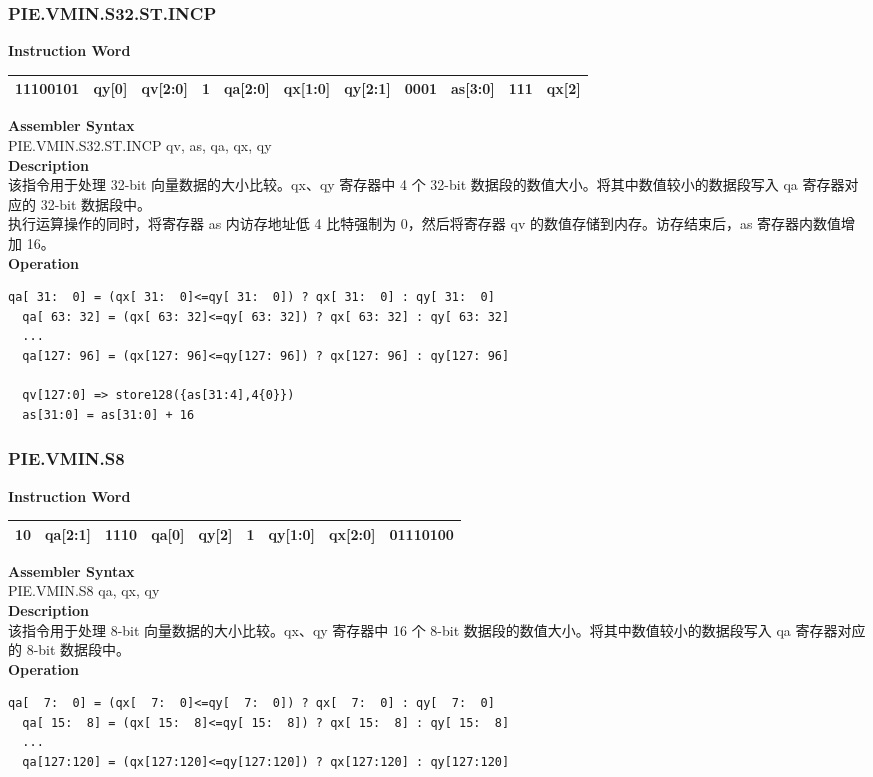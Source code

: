 \newpage
\subsubsection{PIE.VMIN.S32.ST.INCP}\label{instruction:PIEVMINS32STINCP}
\setlength\tabcolsep{6pt}
\textbf{Instruction Word} \\
\begin{tabular}{|c|c|c|c|c|c|c|c|c|c|c|}
	\hline
	11100101 & qy[0] & qv[2:0] & 1 & qa[2:0] & qx[1:0] & qy[2:1] & 0001 & as[3:0] & 111 & qx[2] \\
	\hline
\end{tabular}

\textbf{Assembler Syntax} \\
PIE.VMIN.S32.ST.INCP qv, as, qa, qx, qy \\
\textbf{Description} \\
该指令用于处理 32-bit 向量数据的大小比较。qx、qy 寄存器中 4 个 32-bit 数据段的数值大小。将其中数值较小的数据段写入 qa 寄存器对应的 32-bit 数据段中。\\
执行运算操作的同时，将寄存器 as 内访存地址低 4 比特强制为 0，然后将寄存器 qv 的数值存储到内存。访存结束后，as 寄存器内数值增加 16。\\
\textbf{Operation}
\begin{lstlisting}[escapeinside=`?]
  qa[ 31:  0] = (qx[ 31:  0]<=qy[ 31:  0]) ? qx[ 31:  0] : qy[ 31:  0]
  qa[ 63: 32] = (qx[ 63: 32]<=qy[ 63: 32]) ? qx[ 63: 32] : qy[ 63: 32]
  ...
  qa[127: 96] = (qx[127: 96]<=qy[127: 96]) ? qx[127: 96] : qy[127: 96]

  qv[127:0] => store128({as[31:4],4{0}})
  as[31:0] = as[31:0] + 16
\end{lstlisting}

\newpage
\subsubsection{PIE.VMIN.S8}\label{instruction:PIEVMINS8}
\setlength\tabcolsep{6pt}
\textbf{Instruction Word} \\
\begin{tabular}{|c|c|c|c|c|c|c|c|c|}
	\hline
	10 & qa[2:1] & 1110 & qa[0] & qy[2] & 1 & qy[1:0] & qx[2:0] & 01110100 \\
	\hline
\end{tabular}

\textbf{Assembler Syntax} \\
PIE.VMIN.S8 qa, qx, qy \\
\textbf{Description} \\
该指令用于处理 8-bit 向量数据的大小比较。qx、qy 寄存器中 16 个 8-bit 数据段的数值大小。将其中数值较小的数据段写入 qa 寄存器对应的 8-bit 数据段中。\\
\textbf{Operation}
\begin{lstlisting}[escapeinside=`?]
  qa[  7:  0] = (qx[  7:  0]<=qy[  7:  0]) ? qx[  7:  0] : qy[  7:  0]
  qa[ 15:  8] = (qx[ 15:  8]<=qy[ 15:  8]) ? qx[ 15:  8] : qy[ 15:  8]
  ...
  qa[127:120] = (qx[127:120]<=qy[127:120]) ? qx[127:120] : qy[127:120]
\end{lstlisting}

